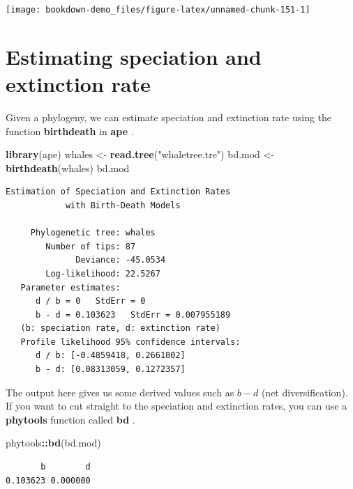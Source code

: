 \documentclass[
]{book}
\newenvironment{Shaded}{\begin{snugshade}}{\end{snugshade}}
\newcommand{\KeywordTok}[1]{\textcolor[rgb]{0.13,0.29,0.53}{\textbf{#1}}}
\newcommand{\NormalTok}[1]{#1}
\newcommand{\OperatorTok}[1]{\textcolor[rgb]{0.81,0.36,0.00}{\textbf{#1}}}
\newcommand{\StringTok}[1]{\textcolor[rgb]{0.31,0.60,0.02}{#1}}
\begin{document}
\begin{center}\texttt{[image: bookdown-demo\_files/figure-latex/unnamed-chunk-151-1]} \end{center}

\hypertarget{estimating-speciation-and-extinction-rate}{%
\section{Estimating speciation and extinction rate}\label{estimating-speciation-and-extinction-rate}}

Given a phylogeny, we can estimate speciation and extinction rate using the function \textbf{birthdeath} in \textbf{ape} \citep{ape}.

\begin{Shaded}
\begin{Highlighting}[]
\KeywordTok{library}\NormalTok{(ape)}
\NormalTok{whales \textless{}{-}}\StringTok{ }\KeywordTok{read.tree}\NormalTok{(}\StringTok{"whaletree.tre"}\NormalTok{)}
\NormalTok{bd.mod \textless{}{-}}\StringTok{ }\KeywordTok{birthdeath}\NormalTok{(whales)}
\NormalTok{bd.mod}
\end{Highlighting}
\end{Shaded}

\begin{verbatim}
Estimation of Speciation and Extinction Rates
            with Birth-Death Models

     Phylogenetic tree: whales 
        Number of tips: 87 
              Deviance: -45.0534 
        Log-likelihood: 22.5267 
   Parameter estimates:
      d / b = 0   StdErr = 0 
      b - d = 0.103623   StdErr = 0.007955189 
   (b: speciation rate, d: extinction rate)
   Profile likelihood 95% confidence intervals:
      d / b: [-0.4859418, 0.2661802]
      b - d: [0.08313059, 0.1272357]
\end{verbatim}

The output here gives us some derived values such as \(b - d\) (net diversification). If you want to cut straight to the speciation and extinction rates, you can use a \textbf{phytools} function called \textbf{bd} \citep{phytools}.

\begin{Shaded}
\begin{Highlighting}[]
\NormalTok{phytools}\OperatorTok{::}\KeywordTok{bd}\NormalTok{(bd.mod)}
\end{Highlighting}
\end{Shaded}

\begin{verbatim}
       b        d 
0.103623 0.000000 
\end{verbatim}
\end{document}
